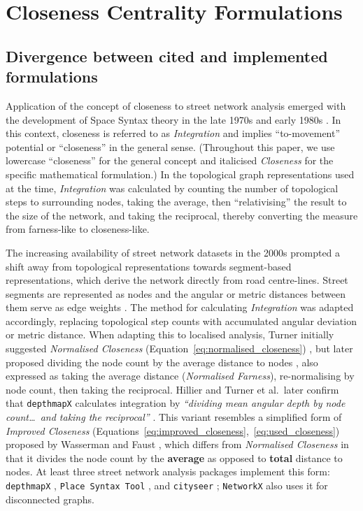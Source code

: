 \section{Closeness Centrality Formulations}\label{closeness_centrality}

\subsection{Divergence between cited and implemented formulations}

Application of the concept of closeness to street network analysis emerged with the development of Space Syntax theory in the late 1970s and early 1980s \cite{Hillier1984}. In this context, closeness is referred to as \emph{Integration} and implies ``to-movement'' potential or ``closeness'' in the general sense. (Throughout this paper, we use lowercase ``closeness'' for the general concept and italicised \emph{Closeness} for the specific mathematical formulation.) In the topological graph representations used at the time, \emph{Integration} was calculated by counting the number of topological steps to surrounding nodes, taking the average, then ``relativising'' the result to the size of the network, and taking the reciprocal, thereby converting the measure from farness-like to closeness-like.

The increasing availability of street network datasets in the 2000s prompted a shift away from topological representations towards segment-based representations, which derive the network directly from road centre-lines. Street segments are represented as nodes and the angular or metric distances between them serve as edge weights \cite{Turner2000, Turner2007}. The method for calculating \emph{Integration} was adapted accordingly, replacing topological step counts with accumulated angular deviation or metric distance. When adapting this to localised analysis, Turner initially suggested \emph{Normalised Closeness} (Equation~\ref{eq:normalised_closeness}) \citeyearpar{Turner2007}, but later proposed dividing the node count by the average distance to nodes \cite{turner_getting_2008}, also expressed as taking the average distance (\emph{Normalised Farness}), re-normalising by node count, then taking the reciprocal. Hillier and Turner et al.\ later confirm that \texttt{depthmapX} calculates integration by \emph{``dividing mean angular depth by node count\ldots\ and taking the reciprocal''} \cite{Hillier2012}. This variant resembles a simplified form of \emph{Improved Closeness} (Equations~\ref{eq:improved_closeness},~\ref{eq:used_closeness}) proposed by Wasserman and Faust \citeyearpar{Wasserman1994}, which differs from \emph{Normalised Closeness} in that it divides the node count by the \textbf{average} as opposed to \textbf{total} distance to nodes. At least three street network analysis packages implement this form: \texttt{depthmapX} \cite{Hillier2012, turner_depthmapx_2020}, \texttt{Place Syntax Tool} \cite{stahle_place_2023}, and \texttt{cityseer} \cite{simons_cityseer_2023}; \texttt{NetworkX} \cite{hagberg_exploring_2008} also uses it for disconnected graphs.

